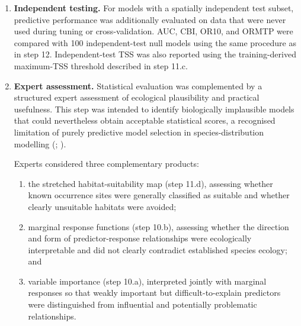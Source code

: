 \documentclass[
  openany]{book}
\begin{document}
\begin{enumerate}
  \begin{enumerate}
  \def\labelenumii{\alph{enumii}.}
  \item
    AUC;
  \item
    CBI;
  \item
    10\% omission rate (OR10): the threshold is the 10th percentile of suitability predicted for training occurrences, and OR10 is the proportion of evaluation occurrences falling below that training-derived threshold. Values substantially above 0.10 indicate poorer-than-expected transfer to evaluation data;
  \item
    minimum-training-presence omission rate (ORMTP): the threshold is the minimum suitability predicted for any training occurrence. Training omission is therefore zero by construction; evaluation omission above zero indicates that some evaluation occurrences receive predictions lower than all training occurrences.
  \end{enumerate}
\item
  \textbf{Independent testing.} For models with a spatially independent test subset, predictive performance was additionally evaluated on data that were never used during tuning or cross-validation. AUC, CBI, OR10, and ORMTP were compared with 100 independent-test null models using the same procedure as in step 12. Independent-test TSS was also reported using the training-derived maximum-TSS threshold described in step 11.c.
\item
  \textbf{Expert assessment.} Statistical evaluation was complemented by a structured expert assessment of ecological plausibility and practical usefulness. This step was intended to identify biologically implausible models that could nevertheless obtain acceptable statistical scores, a recognised limitation of purely predictive model selection in species-distribution modelling (; ).

  Experts considered three complementary products:

  \begin{enumerate}
  \def\labelenumii{\alph{enumii}.}
  \item
    the stretched habitat-suitability map (step 11.d), assessing whether known occurrence sites were generally classified as suitable and whether clearly unsuitable habitats were avoided;
  \item
    marginal response functions (step 10.b), assessing whether the direction and form of predictor-response relationships were ecologically interpretable and did not clearly contradict established species ecology; and
  \item
    variable importance (step 10.a), interpreted jointly with marginal responses so that weakly important but difficult-to-explain predictors were distinguished from influential and potentially problematic relationships.
  \end{enumerate}


\end{enumerate}
\end{document}
